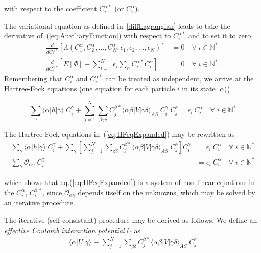 with respect to the coefficient $C_i^{\alpha *}$ (or $C_i^\alpha$).

The variational equation as defined in~\ref{diffLagrangian} leads to take the derivative of~(\ref{eq:AuxiliaryFunction}) with respect to $C_i^{\alpha *}$ and to set it to zero
\begin{align*}
\frac{d}{dC_i^{\alpha *}} \left[ \Lambda(C_1^{\alpha},C_2^{\alpha},\dots,C_N^{\alpha},\epsilon_1,\epsilon_2,\dots,\epsilon_N) \right] &= 0 \quad \forall \; i \in \mathbb{N}^*\\
\frac{d}{dC_i^{\alpha *}} \left[  E[\Phi] - \sum_{i=1}^N \epsilon_i \sum_\alpha C_i^{\alpha *} C_i^{\alpha} \right] &= 0  \quad \forall \; i \in \mathbb{N}^*.
\end{align*}
Remembering that  $C_i^\alpha$ and  $C_i^{\alpha *}$ can be treated as independent, we arrive at the Hartree-Fock equations (one equation for each particle $i$ in its state $|\alpha \rangle$)

\begin{equation}
\label{eq:HFeqExpanded}
\sum_\gamma \langle \alpha | h| \gamma \rangle \; C_i^\gamma +   \sum_{j=1}^N \sum_{\beta  \gamma  \delta} C_j^{\beta *} \langle \alpha \beta | V | \gamma  \delta \rangle_{AS}  \; C_i^\gamma \; C_j^\delta= \epsilon_i \ C_i^\alpha \quad \forall \; i \in \mathbb{N}^*
\end{equation}

The Hartree-Fock equations in~(\ref{eq:HFeqExpanded}) may be rewritten as
\begin{align}
\label{eq:FockMatrix}
\nonumber
\sum_\gamma \langle \alpha | h| \gamma \rangle \; C_i^\gamma +   \sum_\gamma \left[ \sum_{j=1}^N \sum_{\beta \delta} C_j^{\beta *} \langle \alpha \beta | V | \gamma  \delta \rangle_{AS}  \; C_j^\delta \right] C_i^\gamma &= \epsilon_i \ C_i^\alpha \quad \forall \; i \in \mathbb{N}^* \\
\sum_\gamma \mathcal{O}_{\alpha \gamma} \; C_i^\gamma &= \epsilon_i \ C_i^\alpha \quad \forall \; i \in \mathbb{N}^*
\end{align}

which shows that eq.(\ref{eq:HFeqExpanded}) is a system of non-linear equations in the  $C_i^\alpha$, $C_i^{\alpha *}$, since $\mathcal{O}_{\alpha \gamma}$ depends itself on the unknowns, which may be solved by an iterative procedure.

The iterative (self-consistant) procedure may be derived as follows. We define an \textit{effective Coulomb interaction potential} $U$ as
\begin{align}
\label{eq:effCoulombInterac}
\langle \alpha |U| \gamma \rangle \equiv    \sum_{j=1}^N \sum_{\beta \delta} C_j^{\beta *} \langle \alpha \beta | V | \gamma  \delta \rangle_{AS}  \; C_j^\delta
\end{align}


